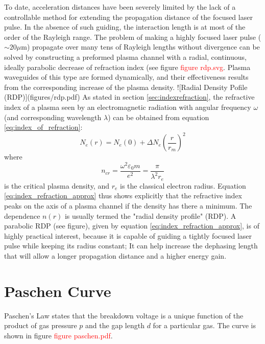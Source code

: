 \documentclass[nofonts]{tufte-book}
\begin{document}
To date, acceleration distances have been severely limited by the lack of a controllable method for extending the propagation distance of the focused laser pulse. In the absence of such guiding, the interaction length is at most of the order of the Rayleigh range. The problem of making a highly
focused laser pulse ($\sim 20 \mu$m) propagate over many tens of Rayleigh lengths without divergence can be solved by constructing a preformed plasma channel with a radial, continuous, ideally parabolic decrease of refraction index (see figure \textcolor{red}{figure rdp.svg}. Plasma waveguides of this type are formed dynamically, and their effectiveness
results from the corresponding increase of the plasma density.
![Radial Density Pofile (RDP)](figures/rdp.pdf)
As stated in section \ref{sec:indexrefraction}, the refractive index of a plasma seen by an electromagnetic radiation with angular frequency $\omega$ (and corresponding wavelength $\lambda$) can be obtained from equation \ref{eq:index_of_refraction}:
\begin{equation} \label{eq:index_refraction_approx}
N_e(r)=N_e(0)+\Delta N_e\left( \frac{r}{r_m}\right)^2
\end{equation}
where
\begin{equation}
n_{cr}=\frac{\omega^2 \varepsilon_0 m}{e^2}=\frac{\pi}{\lambda^2 r_e} \label{eq:critical_density}
\end{equation}
is the critical plasma density, and $r_e$ is the classical electron radius. Equation \ref{eq:index_refraction_approx} thus shows explicitly that the refractive index peaks on the axis of a plasma channel if the density has there a minimum. 
The dependence $n(r)$ is usually termed the "radial density profile" (RDP). A parabolic RDP (see figure), given by equation \ref{eq:index_refraction_approx}, is of highly practical interest, because it is capable \cite{Sprangle1992,Sprangle2000} of guiding a tightly focused laser pulse while keeping its radius constant; It can help increase the dephasing length that will allow a longer propagation distance and a higher energy gain. 

		\section{Paschen Curve}\label{sec:paschen}
Paschen's Law states that the breakdown voltage is a unique function of the product of gas pressure $p$ and the gap length $d$ for a particular gas. The curve is shown in figure \textcolor{red}{figure paschen.pdf}.
\end{document}
